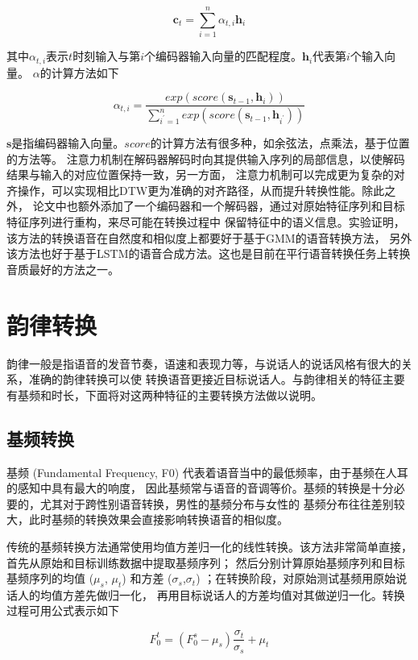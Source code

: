 \begin{equation}
    \mathbf{c}_t = \sum^n_{i=1}\alpha_{t, i}\mathbf{h}_i
\end{equation}

其中$\alpha_{t, i}$表示$t$时刻输入与第$i$个编码器输入向量的匹配程度。$\mathbf{h}_i$代表第$i$个输入向量。
$\alpha$的计算方法如下

\begin{equation}
    \alpha_{t, i} = \frac{exp(score(\mathbf{s}_{t-1},\mathbf{h}_i))}{\sum^{n}_{i^{'}=1}exp(score(\mathbf{s}_{t-1},\mathbf{h}_{i^{'}}))}
\end{equation}

$\mathbf{s}$是指编码器输入向量。$score$的计算方法有很多种，如余弦法，点乘法，基于位置的方法等。
注意力机制在解码器解码时向其提供输入序列的局部信息，以使解码结果与输入的对应位置保持一致，另一方面，
注意力机制可以完成更为复杂的对齐操作，可以实现相比DTW更为准确的对齐路径，从而提升转换性能。除此之外，
论文中也额外添加了一个编码器和一个解码器，通过对原始特征序列和目标特征序列进行重构，来尽可能在转换过程中
保留特征中的语义信息。实验证明，该方法的转换语音在自然度和相似度上都要好于基于GMM的语音转换方法，
另外该方法也好于基于LSTM的语音合成方法。这也是目前在平行语音转换任务上转换音质最好的方法之一。

\section{韵律转换}
韵律一般是指语音的发音节奏，语速和表现力等，与说话人的说话风格有很大的关系，准确的韵律转换可以使
转换语音更接近目标说话人。与韵律相关的特征主要有基频和时长，下面将对这两种特征的主要转换方法做以说明。

\subsection{基频转换}
基频 (Fundamental Frequency, F0) 代表着语音当中的最低频率，由于基频在人耳的感知中具有最大的响度，
因此基频常与语音的音调等价。基频的转换是十分必要的，尤其对于跨性别语音转换，男性的基频分布与女性的
基频分布往往差别较大，此时基频的转换效果会直接影响转换语音的相似度。

传统的基频转换方法通常使用均值方差归一化的线性转换。该方法非常简单直接，首先从原始和目标训练数据中提取基频序列；
然后分别计算原始基频序列和目标基频序列的均值 ($\mu_s$, $\mu_t$) 和方差 ($\sigma_s$,$\sigma_t$) ；在转换阶段，对原始测试基频用原始说话人的均值方差先做归一化，
再用目标说话人的方差均值对其做逆归一化。转换过程可用公式表示如下

\begin{equation}
    F_0^t = (F_0^s - \mu_s)\frac{\sigma_t}{\sigma_s} + \mu_t
\end{equation}

